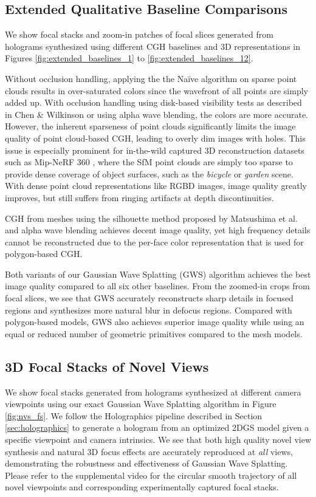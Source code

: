 \subsection{Extended Qualitative Baseline Comparisons}
We show focal stacks and zoom-in patches of focal slices generated from holograms synthesized using different CGH baselines and 3D representations in Figures 
\ref{fig:extended_baselines_1} to \ref{fig:extended_baselines_12}.

Without occlusion handling, applying the the Na\"ive algorithm on sparse point clouds results in over-saturated colors since the wavefront of all points are simply added up. With occlusion handling using disk-based visibility tests as described in Chen \& Wilkinson \cite{chen2009computer} or using alpha wave blending, the colors are more accurate. However, the inherent sparseness of point clouds significantly limits the image quality of point cloud-based CGH, leading to overly dim images with holes. This issue is especially prominent for in-the-wild captured 3D reconstruction datasets such as Mip-NeRF 360 \cite{barron2022mipnerf360}, where the SfM point clouds are simply too sparse to provide dense coverage of object surfaces, such as the \textit{bicycle} or \textit{garden} scene. With dense point cloud representations like RGBD images, image quality greatly improves, but still suffers from ringing artifacts at depth discontinuities.

CGH from meshes using the silhouette method proposed by Matsushima et al. \cite{matsushima2014silhouette}
and alpha wave blending achieves decent image quality, yet high frequency details cannot be reconstructed due to the per-face color representation that is used for polygon-based CGH. 

Both variants of our Gaussian Wave Splatting (GWS) algorithm achieves the best image quality compared to all six other baselines. From the zoomed-in crops from focal slices, we see that GWS accurately reconstructs sharp details in focused regions and synthesizes more natural blur in defocus regions. Compared with polygon-based models, GWS also achieves superior image quality while using an equal or reduced number of geometric primitives compared to the mesh models.

\subsection{3D Focal Stacks of Novel Views}
We show focal stacks generated from holograms synthesized at different camera viewpoints using our exact Gaussian Wave Splatting algorithm in Figure \ref{fig:nvs_fs}. We follow the Holographics pipeline described in Section \ref{sec:holographics} to generate a hologram from an optimized 2DGS model given a specific viewpoint and camera intrinsics. We see that both high quality novel view synthesis and natural 3D focus effects are accurately reproduced at \textit{all} views, demonstrating the robustness and effectiveness of Gaussian Wave Splatting. Please refer to the supplemental video for the circular smooth trajectory of all novel viewpoints and corresponding experimentally captured focal stacks.

